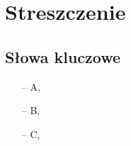 
\chapter*{Streszczenie}
\label{chapter:streszczenie}

\lipsum[1]


\section*{Słowa kluczowe}
\label{section:slowa-kluczowe}

\begin{itemize}
    \item[–] A,
    \item[–] B,
    \item[–] C,
\end{itemize}
